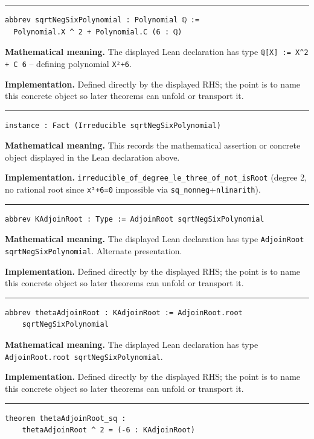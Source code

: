 \documentclass[UTF8,a4paper,11pt,fontset=fandol]{ctexart}
\theoremstyle{definition}
\newcommand{\statementsep}{\par\medskip\hrule\medskip}
\begin{document}
\statementsep
\begin{verbatim}
abbrev sqrtNegSixPolynomial : Polynomial ℚ :=
  Polynomial.X ^ 2 + Polynomial.C (6 : ℚ)
\end{verbatim}
\noindent\textbf{Mathematical meaning.} The displayed Lean declaration has type \texttt{ℚ[X] := X\textasciicircum{}2 + C 6} -- defining polynomial \texttt{X²+6}.\par
\noindent\textbf{Implementation.} Defined directly by the displayed RHS; the point is to name this concrete object so later theorems can unfold or transport it.\par
\statementsep
\begin{verbatim}
instance : Fact (Irreducible sqrtNegSixPolynomial)
\end{verbatim}
\noindent\textbf{Mathematical meaning.} This records the mathematical assertion or concrete object displayed in the Lean declaration above.\par
\noindent\textbf{Implementation.} \texttt{irreducible\_\allowbreak{}of\_\allowbreak{}degree\_\allowbreak{}le\_\allowbreak{}three\_\allowbreak{}of\_\allowbreak{}not\_\allowbreak{}isRoot} (degree 2, no rational root since \texttt{x²+6=0} impossible via \texttt{sq\_\allowbreak{}nonneg}+\texttt{nlinarith}).\par
\statementsep
\begin{verbatim}
abbrev KAdjoinRoot : Type := AdjoinRoot sqrtNegSixPolynomial
\end{verbatim}
\noindent\textbf{Mathematical meaning.} The displayed Lean declaration has type \texttt{AdjoinRoot sqrtNegSixPolynomial}. Alternate presentation.\par
\noindent\textbf{Implementation.} Defined directly by the displayed RHS; the point is to name this concrete object so later theorems can unfold or transport it.\par
\statementsep
\begin{verbatim}
abbrev thetaAdjoinRoot : KAdjoinRoot := AdjoinRoot.root
    sqrtNegSixPolynomial
\end{verbatim}
\noindent\textbf{Mathematical meaning.} The displayed Lean declaration has type \texttt{AdjoinRoot.\allowbreak{}root sqrtNegSixPolynomial}.\par
\noindent\textbf{Implementation.} Defined directly by the displayed RHS; the point is to name this concrete object so later theorems can unfold or transport it.\par
\statementsep
\begin{verbatim}
theorem thetaAdjoinRoot_sq :
    thetaAdjoinRoot ^ 2 = (-6 : KAdjoinRoot)
\end{verbatim}
\end{document}
